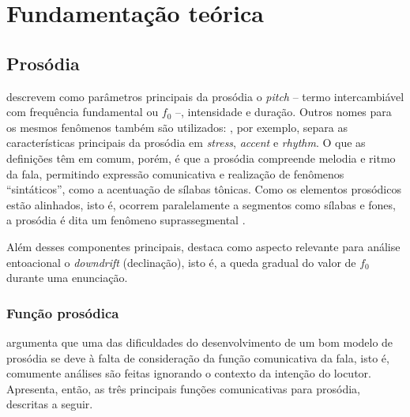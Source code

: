 
\chapter{Fundamentação teórica}

\section{Prosódia}
 descrevem como parâmetros principais da prosódia o
\emph{pitch} -- termo intercambiável com frequência fundamental ou $f_0$ --,
intensidade e duração. Outros nomes para os mesmos fenômenos também são
utilizados: , por exemplo, separa as características
principais da prosódia em \emph{stress}, \emph{accent} e \emph{rhythm}. O que as
definições têm em comum, porém, é que a prosódia compreende melodia e ritmo da
fala, permitindo expressão comunicativa e realização de fenômenos
``sintáticos'', como a acentuação de sílabas tônicas. Como os elementos
prosódicos estão alinhados, isto é, ocorrem paralelamente a segmentos como
sílabas e fones, a prosódia é dita um fenômeno suprassegmental \cite{ladd}.

Além desses componentes principais, 
destaca como aspecto relevante para análise entoacional o \emph{downdrift}
(declinação), isto é, a queda gradual do valor de $ f_0 $ durante uma enunciação.


\subsection{Função prosódica}
 argumenta que uma das dificuldades do desenvolvimento de
um bom modelo de prosódia se deve à falta de consideração da função comunicativa
da fala, isto é, comumente análises são feitas ignorando o contexto da intenção
do locutor. Apresenta, então, as três principais funções comunicativas para
prosódia, descritas a seguir.

